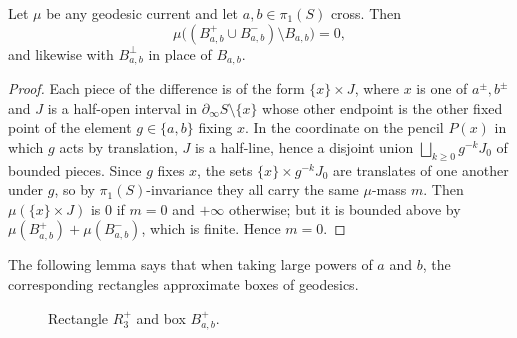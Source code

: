 \begin{lemma}\label{lem:onepoint}
Let $\mu$ be any geodesic current and let $a,b\in\pi_1(S)$ cross. Then
\[
\mu\bigl((B_{a,b}^+\cup B_{a,b}^-)\setminus B_{a,b}\bigr)=0,
\]
and likewise with $B_{a,b}^\perp$ in place of $B_{a,b}$.
\end{lemma}
\begin{proof}
Each piece of the difference is of the form $\{x\}\times J$, where $x$ is
one of $a^\pm,b^\pm$ and $J$ is a half-open interval in
$\partial_\infty S\setminus\{x\}$ whose other endpoint is the other fixed
point of the element $g\in\{a,b\}$ fixing $x$. In the coordinate on the
pencil $P(x)$ in which $g$ acts by translation, $J$ is a half-line, hence
a disjoint union $\bigsqcup_{k\ge0} g^{-k}J_0$ of bounded pieces. Since
$g$ fixes $x$, the sets $\{x\}\times g^{-k}J_0$ are translates of one
another under $g$, so by $\pi_1(S)$-invariance they all carry the same
$\mu$-mass $m$. Then $\mu(\{x\}\times J)$ is $0$ if $m=0$ and $+\infty$
otherwise; but it is bounded above by
$\mu(B_{a,b}^+)+\mu(B_{a,b}^-)$, which is finite. Hence $m=0$.
\end{proof}

The following lemma  says that when taking large powers of $a$ and $b$, the corresponding rectangles approximate boxes of geodesics.

  \begin{figure}
\caption{Rectangle $R_3^+$ and box $B_{a,b}^+$.}
\label{fig:rectangles}
\end{figure}


